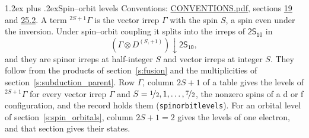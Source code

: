 \documentclass[10pt,a4paper]{article}
\makeatletter
\renewcommand\section{\@startsection{section}{1}{\z@}{-3ex plus -1ex minus -.2ex}%
  {1.2ex plus .2ex}{\normalfont\large\sffamily\bfseries\color{parttitle}}}
\numberwithin{equation}{section}
\newcommand{\grp}[1]{\mathsf{#1}}
\newcommand{\restr}[2]{#1\!\downarrow#2}
\newcommand{\irrJp}[2]{D^{(#1,#2)}}
\newcommand{\irrprod}{\otimes}
\newcommand{\term}[2]{{}^{#1}#2}
\makeatother
\begin{document}
\section{Spin--orbit levels}\label{s:spin_orbit}
Conventions: \href{../../CONVENTIONS.pdf}{CONVENTIONS.pdf}, sections \href{../../../rotation/CONVENTIONS.pdf\#conv.19}{19} and \href{../../CONVENTIONS.pdf\#conv.25.2}{25.2}.
\leavevmode\label{n:local.spin}\label{n:symbol.term}A term $\term{2S+1}{\Gamma}$ is the vector irrep $\Gamma$ with the spin $S$, a spin even under the inversion. Under spin--orbit coupling it splits into the irreps of $\grp{2S_{10}}$ in
\begin{equation}\label{e:spinorbit}\restr{(\Gamma \irrprod \irrJp{S}{+1})}{\grp{2S_{10}}},\end{equation}
and they are spinor irreps at half-integer $S$ and vector irreps at integer $S$. They follow from the products of section~\ref{s:fusion} and the multiplicities of section~\ref{s:subduction_parent}. Row $\Gamma$, column $2S + 1$ of a table gives the levels of $\term{2S+1}{\Gamma}$ for every vector irrep $\Gamma$ and $S = \nicefrac{1}{2}, 1, \dots, \nicefrac{7}{2}$, the nonzero spins of a d or f configuration, and the record holds them (\texttt{spinorbitlevels}). For an orbital level of section~\ref{s:spin_orbitals}, column $2S + 1 = 2$ gives the levels of one electron, and that section gives their states.
\end{document}
